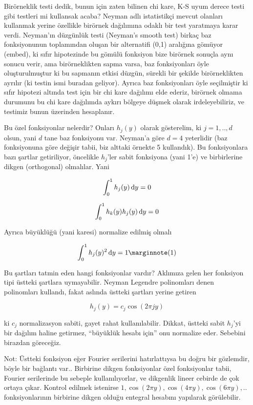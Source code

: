 \documentclass[12pt,fleqn]{article}\usepackage{../../common}
\begin{document}
Birörneklik testi dedik, bunun için zaten bilinen chi kare, K-S uyum derece
testi gibi testleri mi kullansak acaba? Neyman adlı istatistikçi mevcut
olanları kullanmak yerine özellikle birörnek dağılımına odaklı bir test
yaratmaya karar verdi. Neyman'ın düzgünlük testi (Neyman's smooth test)
birkaç baz fonksiyonunun toplamından oluşan bir alternatifi (0,1) aralığına
gömüyor (embed), ki sıfır hipotezinde bu gömülü fonksiyon bize birörnek
sonuçla aynı sonucu verir, ama birörneklikten sapma varsa, baz
fonksiyonları öyle oluşturulmuştur ki bu sapmanın etkisi düzgün, sürekli
bir şekilde birörneklikten ayrılır (ki testin ismi buradan geliyor). Ayrıca
baz fonksiyonları öyle seçilmiştir ki sıfır hipotezi altında test için bir
chi kare dağılımı elde ederiz, birörnek olmama durumunu bu chi kare
dağılımda aykırı bölgeye düşmek olarak irdeleyebiliriz, ve testimiz bunun
üzerinden hesaplanır.

Bu özel fonksiyonlar nelerdir? Onları $h_j(y)$ olarak gösterelim, ki $j=1,..,d$
olsun, yani $d$ tane baz fonksiyonu var. Neyman'a göre $d=4$ yeterlidir (baz
fonksiyonuna göre değişir tabii, biz alttaki örnekte 5 kullandık). Bu
fonksiyonlara bazı şartlar getiriliyor, öncelikle $h_j$'ler sabit fonksiyona
(yani 1'e) ve birbirlerine dikgen (orthogonal) olmalılar. Yani

$$ \int _{0}^{1} h_j(y) \,\mathrm{d} y = 0 $$

$$ \int _{0}^{1} h_k(y)h_j(y) \,\mathrm{d} y = 0 $$

Ayrıca büyüklüğü (yani karesi) normalize edilmiş olmalı

$$ 
\int _{0}^{1} h_j(y)^2 \ud y = 1 
\mlabel{1}
$$

Bu şartları tatmin eden hangi fonksiyonlar vardır? Aklımıza gelen her
fonksiyon tipi üstteki şartlara uymayabilir. Neyman Legendre polinomları
denen polinomları kullandı, fakat aslında üstteki şartları yerine getiren

$$ h_j(y) = c_j \cos (2\pi j y) $$

ki $c_j$ normalizasyon sabiti, gayet rahat kullanılabilir. Dikkat, üstteki
sabit $h_j$'yi bir dağılım haline getirmez, ``büyüklük hesabı için'' onu
normalize eder. Sebebini birazdan göreceğiz. 

Not: Üstteki fonksiyon eğer Fourier serilerini hatırlattıysa bu doğru bir
gözlemdir, böyle bir bağlantı var.. Birbirine dikgen fonksiyonlar özel
fonksiyonlar tabii, Fourier serilerinde bu sebeple kullanılıyorlar, ve
dikgenlik lineer cebirde de çok ortaya çıkar. Kontrol edilmek istenirse 
$1, \cos (2\pi y), \cos (4\pi y), \cos (6 \pi y), ..$ fonksiyonlarının birbirine
dikgen olduğu entegral hesabını yapılarak görülebilir. 
\end{document}
